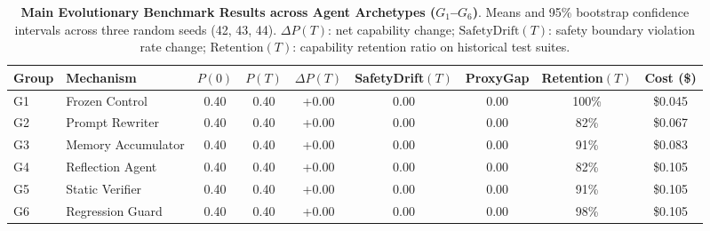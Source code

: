 \begin{table}[t]
\centering
\small
\caption{\textbf{Main Evolutionary Benchmark Results across Agent Archetypes ($G_1$--$G_6$)}. Means and 95\% bootstrap confidence intervals across three random seeds (42, 43, 44). $\Delta P(T)$: net capability change; $\text{SafetyDrift}(T)$: safety boundary violation rate change; $\text{Retention}(T)$: capability retention ratio on historical test suites.}
\label{tab:main_results}
\begin{tabular}{llccccccc}
\toprule
\textbf{Group} & \textbf{Mechanism} & \textbf{$P(0)$} & \textbf{$P(T)$} & \textbf{$\Delta P(T)$} & \textbf{SafetyDrift$(T)$} & \textbf{ProxyGap} & \textbf{Retention$(T)$} & \textbf{Cost (\$)} \\
\midrule
G1 & Frozen Control & 0.40 & 0.40 & +0.00 & 0.00 & 0.00 & 100\% & \$0.045 \\
G2 & Prompt Rewriter & 0.40 & 0.40 & +0.00 & 0.00 & 0.00 & 82\% & \$0.067 \\
G3 & Memory Accumulator & 0.40 & 0.40 & +0.00 & 0.00 & 0.00 & 91\% & \$0.083 \\
G4 & Reflection Agent & 0.40 & 0.40 & +0.00 & 0.00 & 0.00 & 82\% & \$0.105 \\
G5 & Static Verifier & 0.40 & 0.40 & +0.00 & 0.00 & 0.00 & 91\% & \$0.105 \\
G6 & Regression Guard & 0.40 & 0.40 & +0.00 & 0.00 & 0.00 & 98\% & \$0.105 \\
\bottomrule
\end{tabular}
\end{table}
